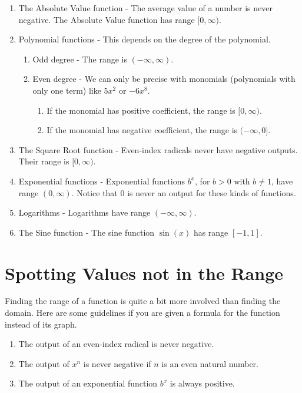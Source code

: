 \documentclass[nooutcomes]{ximera}
\begin{document}
	\begin{callout}
		\begin{enumerate}	
			\item The Absolute Value function - The average value of a number is never negative. The Absolute Value function has range $[0, \infty)$.
	
			\item Polynomial functions -  This depends on the degree of the polynomial.
				\begin{enumerate}
					\item Odd degree - The range is $(-\infty, \infty)$.
					\item Even degree - We can only be precise with monomials (polynomials with only one term) like $5x^2$ or $-6x^8$. 
						\begin{enumerate}
							\item If the monomial has positive coefficient, the range is $[0, \infty)$.
							\item If the monomial has negative coefficient, the range is $(-\infty, 0]$.
						\end{enumerate}
				\end{enumerate}
					
			\item The Square Root function - Even-index radicals never have negative outputs. Their range is $[0, \infty)$.		
	
			\item Exponential functions - Exponential functions $b^x$, for $b >0$ with $b \neq 1$,  have range $(0, \infty)$. Notice that $0$ is
					never an output for these kinds of functions.
	
			\item Logarithms - Logarithms have range $(-\infty, \infty)$.
				
			\item The Sine function - The sine function $\sin(x)$ has range $[-1,1]$.
		\end{enumerate}
	\end{callout}

\section{Spotting Values not in the Range}
	Finding the range of a function is quite a bit more involved than finding the domain. Here are some guidelines if you are given a formula for the function instead of its graph.
	\begin{callout}
		\begin{enumerate}
			\item The output of an even-index radical is never negative.
			\item The output of $x^n$ is never negative if $n$ is an even natural number.
			\item The output of an exponential function $b^x$ is always positive.
		\end{enumerate}
	\end{callout}
	
\end{document}
